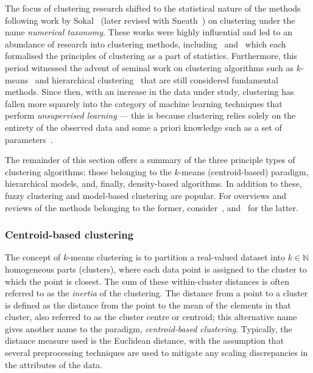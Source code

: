 The focus of clustering research shifted to the statistical nature of the
methods following work by Sokal~\cite{Sokal1966} (later revised with
Sneath~\cite{Sneath1973}) on clustering under the name \emph{numerical
taxonomy}. These works were highly influential and led to an abundance of
research into clustering methods, including~\cite{Diday1976}
and~\cite{Hartigan1975} which each formalised the principles of clustering as a
part of statistics. Furthermore, this period witnessed the advent of seminal
work on clustering algorithms such as \(k\)-means~\cite{Hartigan1979} and
hierarchical clustering~\cite{Defays1977,Sibson1973} that are still considered
fundamental methods.  %
Since then, with an increase in the data under study,
clustering has fallen more squarely into the category of machine learning
techniques that perform \emph{unsupervised learning} --- this is because
clustering relies solely on the entirety of the observed data and some a priori
knowledge such as a set of parameters~\cite{Dayan1999}.

The remainder of this section offers a summary of the three principle types of
clustering algorithms: those belonging to the \(k\)-means (centroid-based)
paradigm, hierarchical models, and, finally, density-based algorithms. In
addition to these, fuzzy clustering and model-based clustering are popular. For
overviews and reviews of the methods belonging to the former,
consider~\cite{Ferraro2019,Gosain2016,Li2016},
and~\cite{Bouveyron2019,Fruhwirth2019,McNicholas2016} for the latter.

\subsubsection{Centroid-based clustering}\label{subsubsec:kmeans}

The concept of \(k\)-means clustering is to partition a
real-valued dataset into \(k \in \mathbb N\) homogeneous parts (clusters), where
each data point is assigned to the cluster to which the point is closest. The
sum of these within-cluster distances is often referred to as the \emph{inertia}
of the clustering. The distance from a point to a cluster is defined as the
distance from the point to the mean of the elements in that cluster, also
referred to as the cluster centre or centroid; this alternative name gives
another name to the paradigm, \emph{centroid-based clustering}. Typically, the
distance measure used is the Euclidean distance, with the assumption that
several preprocessing techniques are used to mitigate any scaling discrepancies
in the attributes of the data.

